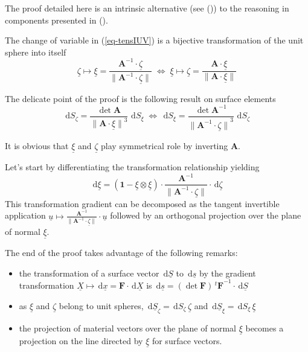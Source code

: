 \documentclass[
  a4paper,
  numbers=noendperiod,
  DIV=12]{scrreprt}
\newcommand{\uu}[1]{{\symbf{{#1}}}}
\newcommand{\uv}[1]{{\underline{{#1}}}}
\newcommand{\trans}[1]{{{}^{t}{#1}}}
\newcommand{\norm}[1]{{\lVert{{#1}}\rVert}}
\newcommand{\ud}{{\,\mathrm{d}}}
\begin{document}
\begin{tcolorbox}[enhanced jigsaw, arc=.35mm, bottomrule=.15mm, bottomtitle=1mm, breakable, colback=white, colbacktitle=quarto-callout-note-color!10!white, colframe=quarto-callout-note-color-frame, coltitle=black, left=2mm, leftrule=.75mm, opacityback=0, opacitybacktitle=0.6, rightrule=.15mm, title=\textcolor{quarto-callout-note-color}{\faInfo}\hspace{0.5em}{Proof of the change of variable in (\ref{eq-tensIUV}) (click for
details)}, titlerule=0mm, toprule=.15mm, toptitle=1mm]

The proof detailed here is an intrinsic alternative (see
()) to the
reasoning in components presented in ().

The change of variable in (\ref{eq-tensIUV}) is a bijective
transformation of the unit sphere into itself \[
\uv{\zeta}\mapsto\uv{\xi}=\frac{\uu{A}^{-1}⋅\uv{\zeta}}{\norm{\uu{A}^{-1}⋅\uv{\zeta}}}
\;\Leftrightarrow\;
\uv{\xi}\mapsto\uv{\zeta}=\frac{\uu{A}⋅\uv{\xi}}{\norm{\uu{A}⋅\uv{\xi}}}
\]

The delicate point of the proof is the following result on surface
elements \[
\ud S_{\zeta}
=\frac{\det{\uu{A}}}{\norm{\uu{A}\cdot\uv{\xi}}^3}\,
\ud S_{\xi}
\;\Leftrightarrow\;
\ud S_{\xi}
=\frac{\det{\uu{A}^{-1}}}{\norm{\uu{A}^{-1}\cdot\uv{\zeta}}^3}\,
\ud S_{\zeta}
\]

It is obvious that \(\uv{\xi}\) and \(\uv{\zeta}\) play symmetrical role
by inverting \(\uu{A}\).

Let's start by differentiating the transformation relationship yielding
\[
\ud \uv{\xi}=\left(\uu{1}-\uv{\xi}\otimes\uv{\xi}\right)\cdot
\frac{\uu{A}^{-1}}{\norm{\uu{A}^{-1}\cdot\uv{\zeta}}}\cdot\ud\uv{\zeta}
\] This transformation gradient can be decomposed as the tangent
invertible application
\(\uv{u}\mapsto\frac{\uu{A}^{-1}}{\norm{\uu{A}^{-1}\cdot\uv{\zeta}}}\cdot\uv{u}\)
followed by an orthogonal projection over the plane of normal
\(\uv{\xi}\).

The end of the proof takes advantage of the following remarks:

\begin{itemize}
\item
  the transformation of a surface vector \(\ud\uv{S}\) to \(\ud\uv{s}\)
  by the gradient transformation
  \(\uv{X}\mapsto\ud\uv{x}=\uu{F}⋅\ud\uv{X}\) is
  \(\ud\uv{s}=(\det{\uu{F}})\,\trans{\uu{F}}^{-1}⋅\ud\uv{S}\)
\item
  as \(\uv{\xi}\) and \(\uv{\zeta}\) belong to unit spheres,
  \(\ud \uv{S}_{\zeta}=\ud S_{\zeta}\,\uv{\zeta}\) and
  \(\ud \uv{S}_{\xi}=\ud S_{\xi}\,\uv{\xi}\)
\item
  the projection of material vectors over the plane of normal
  \(\uv{\xi}\) becomes a projection on the line directed by \(\uv{\xi}\)
  for surface vectors.
\end{itemize}


\end{tcolorbox}
\end{document}
